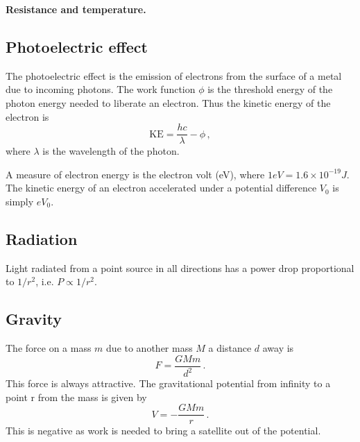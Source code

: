 \documentclass{article}
\begin{document}
\textbf{Resistance and temperature.}
\begin{figure}[H]
    \centering
\end{figure}

\subsection{Photoelectric effect} The photoelectric effect is the emission of electrons from the surface of a metal due to incoming photons. The work function $\phi$ is the threshold energy of the photon energy needed to liberate an electron. Thus the kinetic energy of the electron is
\[
\text{KE}=\frac{hc}{\lambda} - \phi\,,
\]
where $\lambda$ is the wavelength of the photon.

A measure of electron energy is the electron volt (eV), where $1eV=1.6\times 10^{-19}J$. The kinetic energy of an electron accelerated under a potential difference $V_0$ is simply $eV_0$.

\subsection{Radiation}
Light radiated from a point source in all directions has a power drop proportional to $1/r^2$, i.e. $P\propto 1/r^2$.

\subsection{Gravity}
The force on a mass $m$ due to another mass $M$ a distance $d$ away is
\[
F=\frac{GMm}{d^2}\,.
\]
This force is always attractive. The gravitational potential from infinity to a point r from the mass is given by
\[
V=-\frac{GMm}{r}\,.
\]
This is negative as work is needed to bring a satellite out of the potential.
\end{document}
